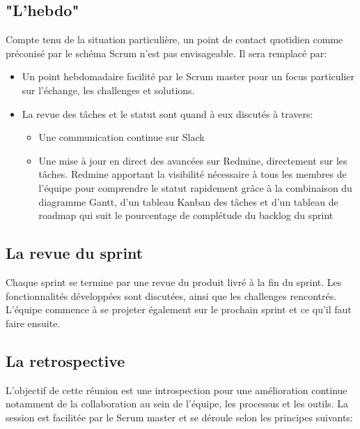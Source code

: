 \subsection{"L'hebdo"}

Compte tenu de la situation particulière, un point de contact quotidien comme préconisé par 
le schéma Scrum n’est pas envisageable. Il sera remplacé par:
 \begin{itemize}
       \item Un point hebdomadaire facilité par le Scrum master pour un focus particulier sur l'échange,
        les challenges et solutions. 
       \item La revue des tâches et le statut sont quand à eux discutés à travers:
       \begin{itemize}
             \item Une communication continue sur Slack
             \item Une mise à jour en direct des avancées sur Redmine, directement sur les tâches. 
             Redmine apportant la visibilité nécessaire à tous les membres de l'équipe pour comprendre 
             le statut rapidement grâce à la combinaison du diagramme Gantt, d’un tableau Kanban 
             des tâches et d’un tableau de roadmap qui suit le pourcentage de complétude du backlog 
             du sprint

       \end{itemize}
 \end{itemize}


\subsection{La revue du sprint}

Chaque sprint se termine par une revue du produit livré à la fin du sprint. Les fonctionnalités 
développées sont discutées, ainsi que les challenges rencontrés.
L'équipe commence à se projeter également sur le prochain sprint et ce qu’il faut faire ensuite.

\subsection{La retrospective}
L’objectif de cette réunion est une introspection pour une amélioration continue notamment de 
la collaboration au sein de l'équipe, les processus et les outils.
La session est facilitée par le Scrum master et se déroule selon les principes suivants:

